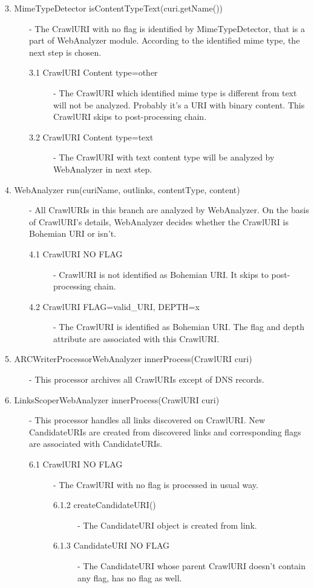 \documentclass[11pt,a4paper]{article}
\begin{document}
\begin{description}
\item[3. MimeTypeDetector isContentTypeText(curi.getName())] - The CrawlURI with no flag is identified by MimeTypeDetector, that is a part of WebAnalyzer module. According to the identified mime type, the next step is chosen.

\begin{description}
\item[3.1 CrawlURI Content type=other] - The CrawlURI which identified mime type is different from text will not be analyzed. Probably it's a URI with binary content. This CrawlURI skips to post-processing chain.
\item[3.2 CrawlURI Content type=text] - The CrawlURI with text content type will be analyzed by WebAnalyzer in next step.
\end{description}

\item[4. WebAnalyzer run(curiName, outlinks, contentType, content)] - All CrawlURIs in this branch are analyzed by WebAnalyzer. On the basis of CrawlURI's details, WebAnalyzer decides whether the CrawlURI is Bohemian URI or isn't.

\begin{description}
\item[4.1 CrawlURI NO FLAG] - CrawlURI is not identified as Bohemian URI. It skips to post-processing chain.
\item[4.2 CrawlURI FLAG=valid\_URI, DEPTH=x] - The CrawlURI is identified as Bohemian URI. The flag and depth attribute are associated with this CrawlURI.
\end{description}

\item[5. ARCWriterProcessorWebAnalyzer innerProcess(CrawlURI curi)] - This processor archives all CrawlURIs except of DNS records.
\item[6. LinksScoperWebAnalyzer innerProcess(CrawlURI curi)] - This processor handles all links discovered on CrawlURI. New CandidateURIs are created from discovered links and corresponding flags are associated with CandidateURIs.

\begin{description}
\item[6.1 CrawlURI NO FLAG] - The CrawlURI with no flag is processed in usual way.

\begin{description}
\item[6.1.2 createCandidateURI()] - The CandidateURI object is created from link.
\item[6.1.3 CandidateURI NO FLAG] - The CandidateURI whose parent CrawlURI doesn't contain any flag, has no flag as well.
\end{description}


\end{description}
\end{description}
\end{document}
